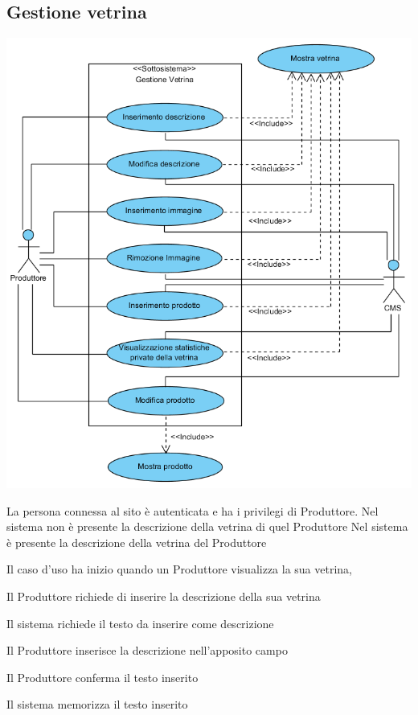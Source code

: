 \subsection{Gestione vetrina}
\begin{center}
   \includegraphics[width=\textwidth]{assets/visualParadigm/GestioneVentrina}
\end{center}
{}
{La persona connessa al sito è autenticata e ha i privilegi di Produttore. Nel sistema non è presente la descrizione della vetrina di quel Produttore}
{Nel sistema è presente la descrizione della vetrina del Produttore}
{\begin{enumCU}
		\item Il caso d'uso ha inizio quando un Produttore visualizza la sua vetrina, 
		\item Il Produttore richiede di inserire la descrizione della sua vetrina
		\item Il sistema richiede il testo da inserire come descrizione 
		\item Il Produttore inserisce la descrizione nell'apposito campo\label{cuinsdescr:2}
		\item Il Produttore conferma il testo inserito
		\item Il sistema memorizza il testo inserito
	\end{enumCU}}
